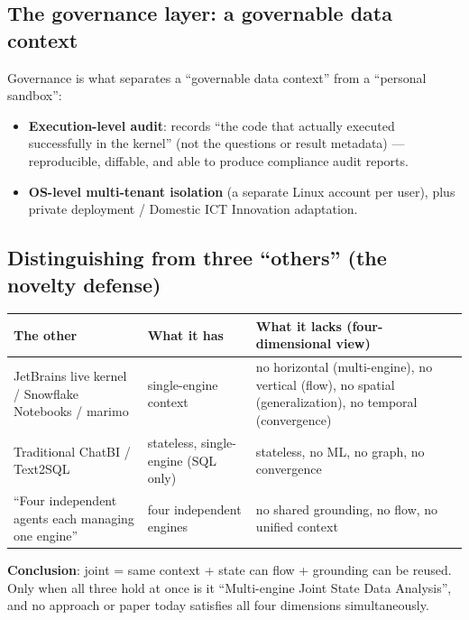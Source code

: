 \documentclass[11pt]{article}
\begin{document}
\subsection{The governance layer: a governable data context}

Governance is what separates a ``governable data context'' from a ``personal sandbox'':

\begin{itemize}
\item
  \textbf{Execution-level audit}: records ``the code that actually executed successfully in the kernel'' (not the questions or result metadata) --- reproducible, diffable, and able to produce compliance audit reports.
\item
  \textbf{OS-level multi-tenant isolation} (a separate Linux account per user), plus private deployment / Domestic ICT Innovation adaptation.
\end{itemize}

\subsection{Distinguishing from three ``others'' (the novelty defense)}

{\small
\begin{tabular}{@{}
  >{\raggedright\arraybackslash}p{}
  >{\raggedright\arraybackslash}p{}
  >{\raggedright\arraybackslash}p{}@{}}
\toprule
The other & What it has & What it lacks (four-dimensional view) \\
\midrule
JetBrains live kernel / Snowflake Notebooks / marimo & single-engine context & no horizontal (multi-engine), no vertical (flow), no spatial (generalization), no temporal (convergence) \\
Traditional ChatBI / Text2SQL & stateless, single-engine (SQL only) & stateless, no ML, no graph, no convergence \\
``Four independent agents each managing one engine'' & four independent engines & no shared grounding, no flow, no unified context \\
\bottomrule
\end{tabular}}

\textbf{Conclusion}: joint = same context + state can flow + grounding can be reused. Only when all three hold at once is it ``Multi-engine Joint State Data Analysis'', and no approach or paper today satisfies all four dimensions simultaneously.
\end{document}
